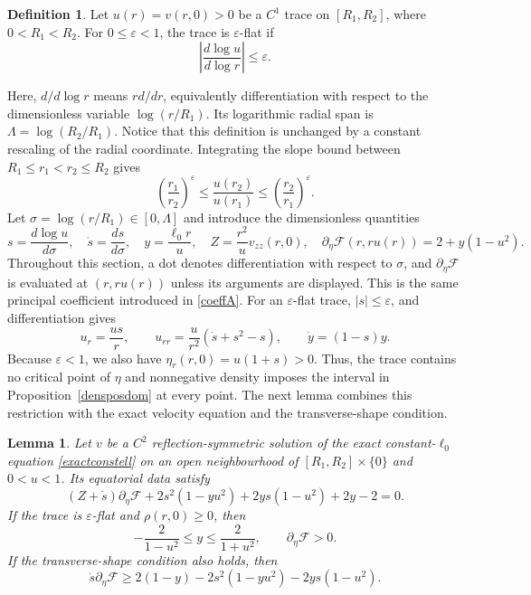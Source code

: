 \documentclass[amsmath,amsfonts,amssymb,aps,pra,superscriptaddress,10pt]{revtex4-2}
\numberwithin{equation}{section}
\theoremstyle{plain}
\newtheorem{lemma}{Lemma}
\theoremstyle{definition}
\newtheorem{definition}{Definition}
\theoremstyle{remark}
\theoremstyle{definition}
\newcommand{\ellzero}{\ell_0}
\begin{document}
\begin{definition}
Let $u(r)=v(r,0)>0$ be a $C^1$ trace on $[R_1,R_2]$, where $0<R_1<R_2$. For $0\leq\varepsilon<1$, the trace is $\varepsilon$-flat if
\begin{equation}
\left|\frac{d\log{u}}{d\log{r}}\right|\leq\varepsilon.
\end{equation}
\end{definition}
Here, $d/d\log{r}$ means $rd/dr$, equivalently differentiation with respect to the dimensionless variable $\log{(r/R_1)}$. Its logarithmic radial span is $\Lambda=\log(R_2/R_1)$. Notice that this definition is unchanged by a constant rescaling of the radial coordinate. Integrating the slope bound between $R_1\leq r_1<r_2\leq R_2$ gives
\begin{equation}
\left(\frac{r_1}{r_2}\right)^{\varepsilon}\leq
\frac{u(r_2)}{u(r_1)}\leq\left(\frac{r_2}{r_1}\right)^\varepsilon.
\end{equation}
Let $\sigma=\log{(r/R_1)}\in[0,\Lambda]$ and introduce the dimensionless quantities
\begin{equation}\label{dimlessq}
s=\frac{d\log{u}}{d\sigma},\quad
\dot{s}=\frac{ds}{d\sigma},\quad
y=\frac{\ellzero r}{u},\quad
Z=\frac{r^2}{u}v_{zz}(r,0),\quad
\partial_\eta\mathcal{F}(r,ru(r))=2+y(1-u^2).
\end{equation}
Throughout this section, a dot denotes differentiation with respect to $\sigma$, and $\partial_\eta\mathcal{F}$ is evaluated at $(r,ru(r))$ unless its arguments are displayed. This is the same principal coefficient introduced in \eqref{coeffA}. For an $\varepsilon$-flat trace, $|s|\leq\varepsilon$, and differentiation gives
\begin{equation}\label{appflatderident}
u_r=\frac{us}{r},\qquad
u_{rr}=\frac{u}{r^2}(\dot{s}+s^2-s),\qquad
\dot{y}=(1-s)y.
\end{equation}
Because $\varepsilon<1$, we also have $\eta_r(r,0)=u(1+s)>0$. Thus, the trace contains no critical point of $\eta$ and nonnegative density imposes the interval in Proposition~\ref{densposdom} at every point. The next lemma combines this restriction with the exact velocity equation and the transverse-shape condition.

\begin{lemma}
Let $v$ be a $C^2$ reflection-symmetric solution of the exact constant-$\ellzero$ equation \eqref{exactconstell} on an open neighbourhood of $[R_1,R_2]\times\{0\}$ and $0<u<1$. Its equatorial data satisfy
\begin{equation}\label{exeqlogident}
(Z+\dot{s})\partial_\eta\mathcal{F}+2s^2(1-yu^2)+2ys(1-u^2)+2y-2=0.
\end{equation}
If the trace is $\varepsilon$-flat and $\rho(r,0)\geq 0$, then
\begin{equation}
-\frac{2}{1-u^2}\leq y\leq\frac{2}{1+u^2},\qquad
\partial_\eta\mathcal{F}>0.
\end{equation}
If the transverse-shape condition also holds, then
\begin{equation}\label{masterapproxflatineq}
\dot{s}\partial_\eta\mathcal{F}\geq 2(1-y)-2s^2(1-yu^2)-2ys(1-u^2).
\end{equation}
\end{lemma}
\end{document}

